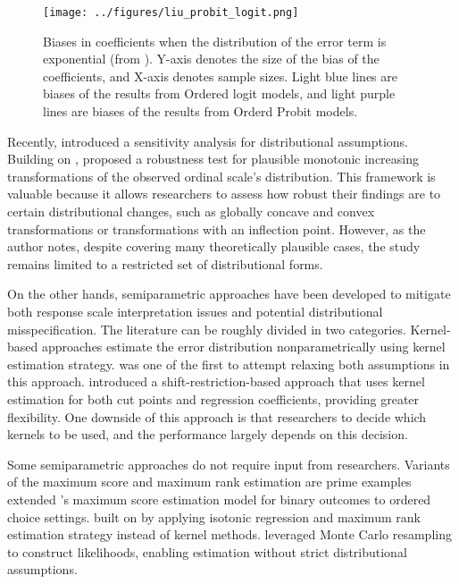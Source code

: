 \documentclass{article}
\begin{document}
\begin{figure}
    \begin{center}
        \texttt{[image: ../figures/liu\_probit\_logit.png]}
    \end{center}
    \caption{Biases in coefficients when the distribution of the error term is exponential (from \citet{Liu2024a}). Y-axis denotes the size of the bias of the coefficients, and X-axis denotes sample sizes. Light blue lines are biases of the results from Ordered logit models, and light purple lines are biases of the results from Orderd Probit models.}\label{fig:2}
\end{figure}


Recently, \citet{Bloem2022a} introduced a sensitivity analysis for distributional assumptions. Building on \citet{Schroder2017a}, \citet{Bloem2022a} proposed a robustness test for plausible monotonic increasing transformations of the observed ordinal scale’s distribution. This framework is valuable because it allows researchers to assess how robust their findings are to certain distributional changes, such as globally concave and convex transformations or transformations with an inflection point. However, as the author notes, despite covering many theoretically plausible cases, the study remains limited to a restricted set of distributional forms.

On the other hands, semiparametric approaches have been developed to mitigate both response scale interpretation issues and potential distributional misspecification. The literature can be roughly divided in two categories. Kernel-based approaches estimate the error distribution nonparametrically using kernel estimation strategy. \citet{Lewbel2000a} was one of the first to attempt relaxing both assumptions in this approach. \citet{Klein2002a} introduced a shift-restriction-based approach that uses kernel estimation for both cut points and regression coefficients, providing greater flexibility. One downside of this approach is that researchers to decide which kernels to be used, and the performance largely depends on this decision.

Some semiparametric approaches do not require input from researchers. Variants of the maximum score and maximum rank estimation are prime examples \citet{Lee1992a} extended \citet{Manski1985a}’s maximum score estimation model for binary outcomes to ordered choice settings. \citet{Liu2024a} built on \citet{Klein2002a} by applying isotonic regression and maximum rank estimation strategy instead of kernel methods. \citet{Ito2021a} leveraged Monte Carlo resampling to construct likelihoods, enabling estimation without strict distributional assumptions.  %
\end{document}
